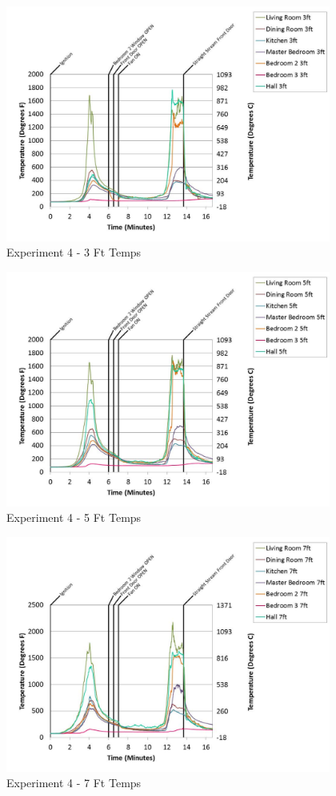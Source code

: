 \documentclass{article}
\begin{document}
\begin{appendices}
	\begin{figure}[h!]
		\centering
		\includegraphics[height=3.05in]{0_Images/Results_Charts/Exp_4_Charts/3FtTemps.pdf}
		\caption{Experiment 4 - 3 Ft Temps}
	\end{figure}
 
	\clearpage

	\begin{figure}[h!]
		\centering
		\includegraphics[height=3.05in]{0_Images/Results_Charts/Exp_4_Charts/5FtTemps.pdf}
		\caption{Experiment 4 - 5 Ft Temps}
	\end{figure}
 

	\begin{figure}[h!]
		\centering
		\includegraphics[height=3.05in]{0_Images/Results_Charts/Exp_4_Charts/7FtTemps.pdf}
		\caption{Experiment 4 - 7 Ft Temps}
	\end{figure}
 

\end{appendices}
\end{document}
